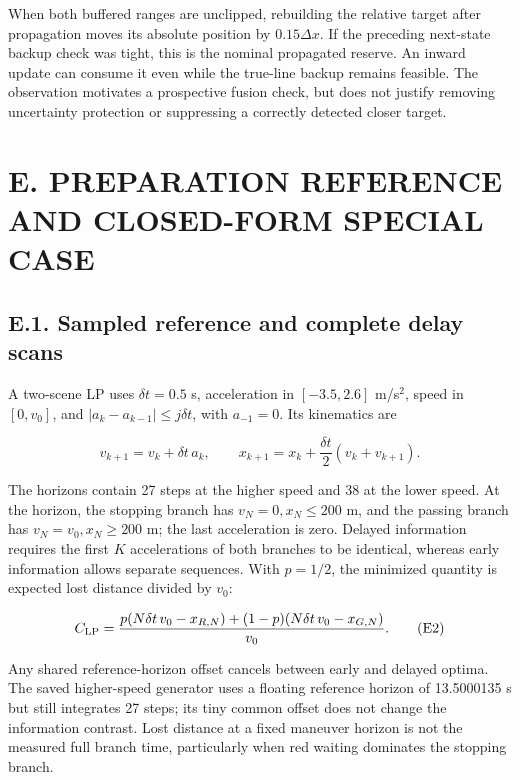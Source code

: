 \documentclass[letterpaper,journal,onecolumn]{IEEEtran}
\begin{document}
When both buffered ranges are unclipped, rebuilding the relative target after propagation moves its absolute position by \(0.15\Delta x\). If the preceding next-state backup check was tight, this is the nominal propagated reserve. An inward update can consume it even while the true-line backup remains feasible. The observation motivates a prospective fusion check, but does not justify removing uncertainty protection or suppressing a correctly detected closer target.

\FloatBarrier{}\section*{E. PREPARATION REFERENCE AND CLOSED-FORM SPECIAL CASE}\setcounter{subsection}{0}

\subsection*{E.1. Sampled reference and complete delay scans}

A two-scene LP uses \(\delta t=0.5\) s, acceleration in \([-3.5,2.6]\) m/s\(^2\), speed in \([0,v_0]\), and \(|a_k-a_{k-1}|\le j\delta t\), with \(a_{-1}=0\). Its kinematics are

\[v_{k+1}=v_k+\delta t\,a_k,\qquad x_{k+1}=x_k+\frac{\delta t}{2}(v_k+v_{k+1}).\tag{E1}\]

The horizons contain 27 steps at the higher speed and 38 at the lower speed. At the horizon, the stopping branch has \(v_N=0,x_N\le200\) m, and the passing branch has \(v_N=v_0,x_N\ge200\) m; the last acceleration is zero. Delayed information requires the first \(K\) accelerations of both branches to be identical, whereas early information allows separate sequences. With \(p=1/2\), the minimized quantity is expected lost distance divided by \(v_0\):

\[C_{\rm LP}=\frac{p(N\delta t\,v_0-x_{R,N})+(1-p)(N\delta t\,v_0-x_{G,N})}{v_0}.\tag{E2}\]

Any shared reference-horizon offset cancels between early and delayed optima. The saved higher-speed generator uses a floating reference horizon of 13.5000135 s but still integrates 27 steps; its tiny common offset does not change the information contrast. Lost distance at a fixed maneuver horizon is not the measured full branch time, particularly when red waiting dominates the stopping branch.
\end{document}
